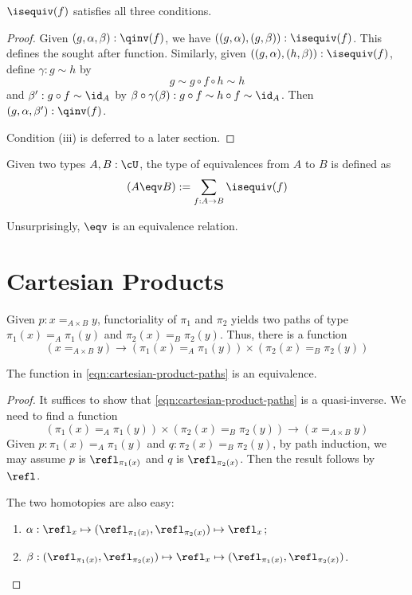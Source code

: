 \documentclass{amsart}
\begin{document}
\begin{lem}
  $\isequiv(f)$ satisfies all three conditions.
\end{lem}
\begin{proof}
  Given $(g,\alpha,\beta) : \qinv(f)$, we have $((g,\alpha),(g,\beta)) : \isequiv(f)$.
  This defines the sought after function.
  Similarly, given $((g,\alpha),(h,\beta)) : \isequiv(f)$, define $\gamma : g \sim h$ by
  \[
    g \sim g \circ f \circ h \sim h
  \]
  and $\beta' : g \circ f \sim \id_{A}$ by $\beta \circ \gamma(\beta) : g \circ f \sim h \circ f \sim \id_{A}$.
  Then $(g,\alpha,\beta') : \qinv(f)$.

  Condition (iii) is deferred to a later section.
\end{proof}

\begin{defn}
  Given two types $A, B : \cU$, the type of equivalences from $A$ to $B$ is defined as
  \[
    (A \eqv B) := \sum_{f : A \to B}\isequiv(f)
  \]
\end{defn}
Unsurprisingly, $\eqv$ is an equivalence relation.

\section{Cartesian Products}
\label{sec:cartesian-products}

Given $p : x =_{A \times B} y$, functoriality of $\pi_{1}$ and $\pi_{2}$ yields two paths of type $\pi_{1}(x) =_{A} \pi_{1}(y)$ and $\pi_{2}(x) =_{B} \pi_{2}(y)$.
Thus, there is a function
\begin{equation}\label{eqn:cartesian-product-paths}
  (x =_{A \times B} y) \to (\pi_{1}(x) =_{A} \pi_{1}(y)) \times (\pi_{2}(x) =_{B} \pi_{2}(y))
\end{equation}

\begin{lem}
  The function in \eqref{eqn:cartesian-product-paths} is an equivalence.
\end{lem}
\begin{proof}
  It suffices to show that \eqref{eqn:cartesian-product-paths} is a quasi-inverse.
  We need to find a function
  \[
    (\pi_{1}(x) =_{A} \pi_{1}(y)) \times (\pi_{2}(x) =_{B} \pi_{2}(y)) \to (x =_{A \times B} y)
  \]
  Given $p : \pi_{1}(x) =_{A} \pi_{1}(y)$ and $q : \pi_{2}(x) =_{B} \pi_{2}(y)$, by path induction, we may assume $p$ is $\refl_{\pi_{1}(x)}$ and $q$ is $\refl_{\pi_{2}(x)}$.
  Then the result follows by $\refl$.

  The two homotopies are also easy:
  \begin{enumerate}
  \item $\alpha : \refl_{x} \mapsto (\refl_{\pi_{1}(x)},\refl_{\pi_{2}(x)}) \mapsto \refl_{x}$;
  \item $\beta : (\refl_{\pi_{1}(x)},\refl_{\pi_{2}(x)}) \mapsto \refl_{x} \mapsto (\refl_{\pi_{1}(x)},\refl_{\pi_{2}(x)})$.
  \end{enumerate}
\end{proof}
\end{document}
